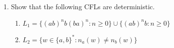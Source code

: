 \documentclass[12pt]{article}
\begin{document}
\begin{spacing}{1.5}
\begin{enumerate}
\begin{enumerate}

                  \end{enumerate}
                  \newpage
            \item[5.] [20 Points] Show that the following CFLs are deterministic.
                  \begin{enumerate}
                        \item[(a)] $L_1=\{(ab)^nb(ba)^n : n \geq 0 \} \cup \{(ab)^nb : n \geq 0 \}$

                        \item[(b)] $L_2=\{w \in \{a,b \}^* : n_a(w) \not= n_b(w) \}$

                  \end{enumerate}

      \end{enumerate}

\end{spacing}
\end{document}
